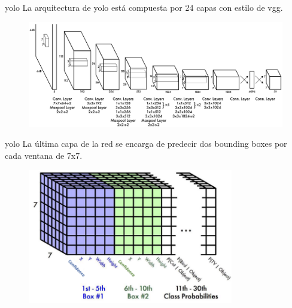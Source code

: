 \begin{frame}{\gls{yolo}}
La arquitectura de \alert{\gls{yolo}} está compuesta por \alert{24 capas} con estilo de \alert{\gls{vgg}}.

\begin{figure}
    \centering
    \includegraphics[width=\textwidth]{figures/Tema 4/YOLO_Architecture.png}
    \caption{\cite{redmon2016you}}
\end{figure}
\end{frame}

\begin{frame}{\gls{yolo}}
La \alert{última capa} de la red se encarga de \alert{predecir} dos \alert{bounding boxes} por cada \alert{ventana} de 7x7.

\begin{figure}
    \centering
    \includegraphics[width=0.8\textwidth]{figures/Tema 4/YOLO_End.png}
    \caption{\cite{YOLOFinal}}
\end{figure}
\end{frame}

